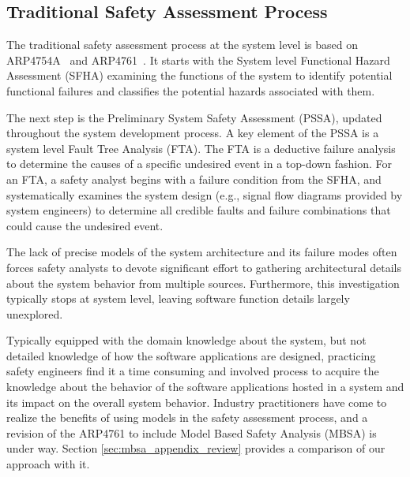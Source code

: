 \subsection{Traditional Safety Assessment Process}
\label{subsec:process}

The traditional safety assessment process at the system level is based on ARP4754A~\cite{SAE:ARP4754A} and ARP4761~\cite{SAE:ARP4761}. It starts with the System level Functional Hazard Assessment (SFHA) examining the functions of the system to identify potential functional failures and classifies the potential hazards associated with them. 

The next step is the Preliminary System Safety Assessment (PSSA), updated throughout the system development process. A key element of the PSSA is a system level Fault Tree Analysis (FTA).  The FTA is a deductive failure analysis to determine the causes of a specific undesired event in a top-down fashion. For an FTA, a safety analyst begins with a failure condition from the SFHA, and systematically examines the system design (e.g., signal flow diagrams provided by system engineers) to determine all credible faults and failure combinations that could cause the undesired event. 

The lack of precise models of the system architecture and its failure modes often forces safety analysts to devote significant effort to gathering architectural details about the system behavior from multiple sources. Furthermore, this investigation typically stops at system level, leaving software function details largely unexplored.

Typically equipped with the domain knowledge about the system, but not detailed knowledge of how the software applications are designed, practicing safety engineers find it a time consuming and involved process to acquire the knowledge about the behavior of the software applications hosted in a system and its impact on the overall system behavior.
Industry practitioners have come to realize the benefits of using models in the safety assessment process, and a revision of the ARP4761 to include Model Based Safety Analysis (MBSA) is under way. Section \ref{sec:mbsa_appendix_review} provides a comparison of our approach with it.


